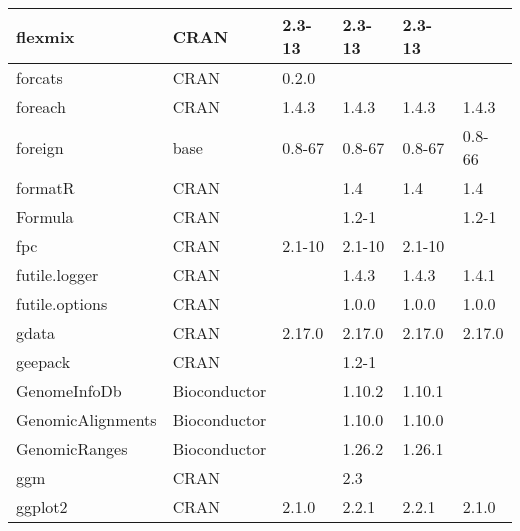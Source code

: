 \begin{longtable}{@{\extracolsep{\fill}}|l|l|l|l|l|l|@{}}
flexmix                       & CRAN                      & 2.3-13      & 2.3-13      & 2.3-13         &                  \\ \hline
forcats                       & CRAN                      & 0.2.0       &             &                &                  \\ \hline
foreach                       & CRAN                      & 1.4.3       & 1.4.3       & 1.4.3          & 1.4.3            \\ \hline
foreign                       & base                      & 0.8-67      & 0.8-67      & 0.8-67         & 0.8-66           \\ \hline
formatR                       & CRAN                      &             & 1.4         & 1.4            & 1.4              \\ \hline
Formula                       & CRAN                      &             & 1.2-1       &                & 1.2-1            \\ \hline
fpc                           & CRAN                      & 2.1-10      & 2.1-10      & 2.1-10         &                  \\ \hline
futile.logger                 & CRAN                      &             & 1.4.3       & 1.4.3          & 1.4.1            \\ \hline
futile.options                & CRAN                      &             & 1.0.0       & 1.0.0          & 1.0.0            \\ \hline
gdata                         & CRAN                      & 2.17.0      & 2.17.0      & 2.17.0         & 2.17.0           \\ \hline
geepack                       & CRAN                      &             & 1.2-1       &                &                  \\ \hline
GenomeInfoDb                  & Bioconductor              &             & 1.10.2      & 1.10.1         &                  \\ \hline
GenomicAlignments             & Bioconductor              &             & 1.10.0      & 1.10.0         &                  \\ \hline
GenomicRanges                 & Bioconductor              &             & 1.26.2      & 1.26.1         &                  \\ \hline
ggm                           & CRAN                      &             & 2.3         &                &                  \\ \hline
ggplot2                       & CRAN                      & 2.1.0       & 2.2.1       & 2.2.1          & 2.1.0            \\ \hline

\end{longtable}
